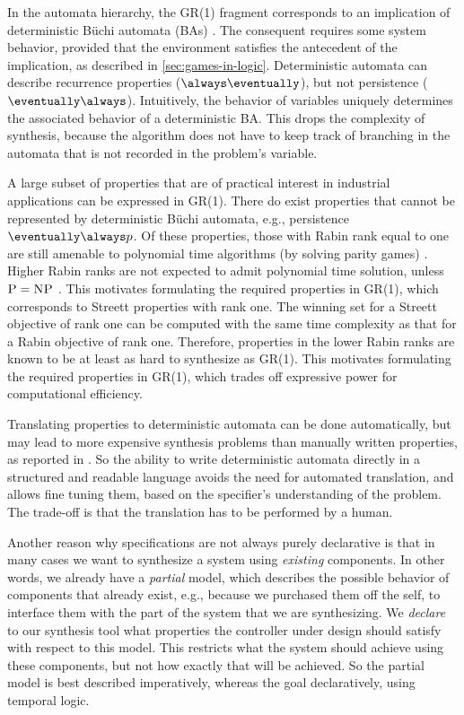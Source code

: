 \documentclass[copyright]{eptcs}
\begin{document}
In the automata hierarchy, the GR(1) fragment corresponds to an implication of deterministic B\"{u}chi automata (BAs) \cite{Piterman06,Schneider04,Morgenstern11wigp,Sohail08vmcai}.
The consequent requires some system behavior, provided that the environment satisfies the antecedent of the implication, as described in \cref{sec:games-in-logic}.
Deterministic automata can describe recurrence properties ($\always \eventually$), but not persistence ($\eventually \always$).
Intuitively, the behavior of variables uniquely determines the associated behavior of a deterministic BA.
This drops the complexity of synthesis, because the algorithm does not have to keep track of branching in the automata that is not recorded in the problem's variable.

A large subset of properties that are of practical interest in industrial applications \cite{Dwyer99icse,Manna90stanford-tr,Bloem12jcss} can be expressed in GR(1).
There do exist properties that cannot be represented by deterministic B\"{u}chi automata, e.g., persistence $\eventually \always p$.
Of these properties, those with Rabin rank equal to one are still amenable to polynomial time algorithms (by solving parity games) \cite{Ehlers11nfm}.
Higher Rabin ranks are not expected to admit polynomial time solution, unless $\textsc{P} = \textsc{NP}$ \cite{Ehlers11nfm}.
This motivates formulating the required properties in GR(1), which corresponds to Streett properties with rank one.
The winning set for a Streett objective of rank one can be computed with the same time complexity as that for a Rabin objective of rank one.
Therefore, properties in the lower Rabin ranks are known to be at least as hard to synthesize as GR(1).
This motivates formulating the required properties in GR(1), which trades off expressive power for computational efficiency.

Translating properties to deterministic automata can be done automatically, but may lead to more expensive synthesis problems than manually written properties, as reported in \cite{Morgenstern11wigp}.
So the ability to write deterministic automata directly in a structured and readable language avoids the need for automated translation, and allows fine tuning them, based on the specifier's understanding of the problem.
The trade-off is that the translation has to be performed by a human.

Another reason why specifications are not always purely declarative is that in many cases we want to synthesize a system using {\em existing} components.
In other words, we already have a {\em partial} model, which describes the possible behavior of components that already exist, e.g., because we purchased them off the self, to interface them with the part of the system that we are synthesizing.
We {\em declare} to our synthesis tool what properties the controller under design should satisfy with respect to this model.
This restricts what the system should achieve using these components, but not how exactly that will be achieved.
So the partial model is best described imperatively, whereas the goal declaratively, using temporal logic.
\end{document}

